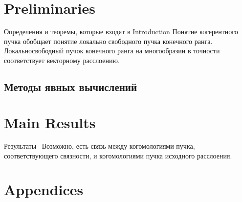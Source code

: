 \documentclass[11pt]{article}
\begin{document}
%
%



    \section{Preliminaries} \label{sec:prelim}
       Определения и теоремы, которые входят в Introduction
        Понятие когерентного пучка обобщает понятие локально
       свободного пучка конечного ранга.
        Локальносвободный пучок конечного ранга на многообразии
        в точности соответствует векторному расслоению.
    \subsection{Методы явных вычислений}\label{subsec:методы-явных-вычислений}



    \section{Main Results}\label{sec:main-results}
        Результаты~
    Возможно, есть связь между когомологиями пучка, соответствующего связности,
    и когомологиями пучка исходного расслоения.




    \section{Appendices}\label{sec:appendices}
\end{document}
